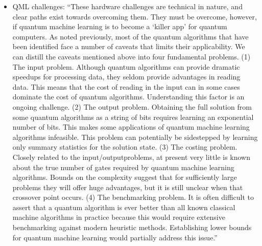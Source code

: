 \documentclass[journal=jacsat,manuscript=article]{achemso}
\begin{document}
\begin{itemize}
	\item  QML challenges: ``These hardware challenges are technical in nature, and clear paths exist towards overcoming them. They must be overcome, however, if quantum machine learning is to become a ‘killer app’ for quantum computers. As noted previously, most of the quantum algorithms that have been identified face a number of caveats that limits their applicability. We can distill the caveats mentioned above into four fundamental problems. (1) The input problem. Although quantum algorithms can provide dramatic speedups for processing data, they seldom provide advantages in reading data. This means that the cost of reading in the input can in some cases dominate the cost of quantum algorithms. Understanding this factor is an ongoing challenge. (2) The output problem. Obtaining the full solution from some quantum algorithms as a string of bits requires learning an exponential number of bits. This makes some applications of quantum machine learning algorithms infeasible. This problem can potentially be sidestepped by learning only summary statistics for the solution state. (3) The costing problem. Closely related to the input/outputproblems, at present very little is known about the true number of gates required by quantum machine learning algorithms. Bounds on the complexity suggest that for sufficiently large problems they will offer huge advantages, but it is still unclear when that crossover point occurs. (4) The benchmarking problem. It is often difficult to assert that a quantum algorithm is ever better than all known classical machine algorithms in practice because this would require extensive benchmarking against modern heuristic methods. Establishing lower bounds for quantum machine learning would partially address this issue.''
\end{itemize}
\end{document}
